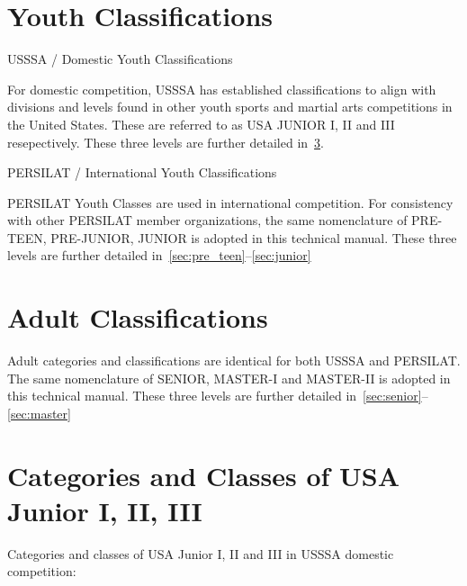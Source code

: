 \section{Youth Classifications}

\begin{legal}
\item USSSA / Domestic Youth Classifications

For domestic competition, USSSA has established classifications to align with divisions and levels 
found in other youth sports and martial arts competitions in the United States.  These are referred to as USA JUNIOR I, II and III resepectively.  These three levels are further detailed in~\ref{sec:usa_junior}.

\item PERSILAT / International Youth Classifications

PERSILAT Youth Classes are used in international competition. For consistency with other
    PERSILAT member organizations, the same nomenclature of PRE-TEEN, PRE-JUNIOR, JUNIOR is adopted in this
    technical manual.  These three levels are further detailed in~\ref{sec:pre_teen}--\ref{sec:junior}
\end{legal}


\section{Adult Classifications}

Adult categories and classifications are identical for both USSSA and PERSILAT. The same nomenclature of SENIOR,
MASTER-I and MASTER-II is adopted in this technical manual.  These three levels are further detailed 
    in~\ref{sec:senior}--\ref{sec:master}


\section{Categories and Classes of USA Junior I, II, III}
\label{sec:usa_junior}

Categories and classes of USA Junior I, II and III in USSSA domestic competition:

